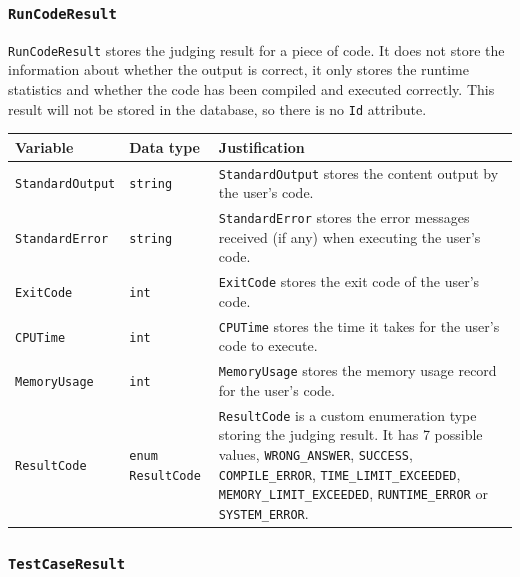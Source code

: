 \documentclass[a4paper]{report}
\begin{document}
\subsubsection{\texttt{RunCodeResult}}

\texttt{RunCodeResult} stores the judging result for a piece of code. It does not store the information about whether the output is correct, it only stores the runtime statistics and whether the code has been compiled and executed correctly. This result will not be stored in the database, so there is no \texttt{Id} attribute.

\begin{tabulary}{\textwidth}{|l|l|L|}
    \hline
    Variable & Data type & Justification \\
    \hline
    \texttt{StandardOutput} & \texttt{string} & \texttt{StandardOutput} stores the content output by the user's code. \\
    \hline
    \texttt{StandardError} & \texttt{string} & \texttt{StandardError} stores the error messages received (if any) when executing the user's code. \\
    \hline
    \texttt{ExitCode} & \texttt{int} & \texttt{ExitCode} stores the exit code of the user's code. \\
    \hline
    \texttt{CPUTime} & \texttt{int} & \texttt{CPUTime} stores the time it takes for the user's code to execute. \\
    \hline
    \texttt{MemoryUsage} & \texttt{int} & \texttt{MemoryUsage} stores the memory usage record for the user's code. \\
    \hline
    \texttt{ResultCode} & \texttt{enum ResultCode} & \texttt{ResultCode} is a custom enumeration type storing the judging result. It has 7 possible values, \texttt{WRONG_ANSWER}, \texttt{SUCCESS}, \texttt{COMPILE_ERROR}, \texttt{TIME_LIMIT_EXCEEDED}, \texttt{MEMORY_LIMIT_EXCEEDED}, \texttt{RUNTIME_ERROR} or \texttt{SYSTEM_ERROR}. \\
    \hline
\end{tabulary}

\subsubsection{\texttt{TestCaseResult}}
\end{document}
